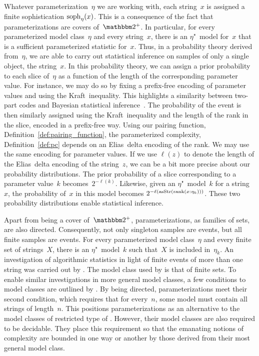 \label{p:inference}%
Whatever parameterization~$\eta$ we are working with, each string~$x$ is assigned a finite sophistication $\operatorname{soph}_\eta(x)$.
This is a consequence of the fact that parameterizations are covers of~$\binary^+$.
In particular, for every parameterized model class~$\eta$ and every string~$x$, there is an $\eta$"~model for~$x$ that is a sufficient parameterized statistic for~$x$.
Thus, in a probability theory derived from~$\eta$, we are able to carry out statistical inference on samples of only a single object, the string~$x$.
In this probability theory, we can assign a prior probability to each slice of~$\eta$ as a function of the length of the corresponding parameter value.
For instance, we may do so by fixing a prefix-free encoding of parameter values and using the Kraft~inequality.
This highlights a similarity between two-part codes and Bayesian statistical inference~\parencite{grunwald2007minimum}.
The probability of the event is then similarly assigned using the Kraft~inequality and the length of the rank in the slice, encoded in a prefix-free way.
Using our pairing function, Definition~\ref{def:pairing_function}, the parameterized complexity, Definition~\ref{def:pc} depends on an Elias~delta encoding of the rank.
We may use the same encoding for parameter values.
If we use $\ell(z)$ to denote the length of the Elias~delta encoding of the string~$z$, we can be a bit more precise about our probability distributions.
The prior probability of a slice corresponding to a parameter value~$k$ becomes~$2^{-\ell(k)}$.
Likewise, given an $\eta$"~model~$k$ for a string~$x$, the probability of~$x$ in this model becomes $2^{-\ell(\operatorname{asStr}(\operatorname{rank}(x : \eta_k)))}$.
These two probability distributions enable statistical inference.

Apart from being a cover of~$\binary^+$, parameterizations, as families of sets, are also directed.
Consequently, not only singleton samples are events, but all finite samples are events.
For every parameterized model class~$\eta$ and every finite set of strings~$X$, there is an $\eta$"~model~$k$ such that~$X$ is included in~$\eta_k$.
An investigation of algorithmic statistics in light of finite events of more than one string was carried out by \textcite{milovanov2016algorithmic}.
The model class used by \citeauthor{milovanov2016algorithmic} is that of finite sets.
To enable similar investigations in more general model classes, a few conditions to model classes are outlined by \textcite[Section~6.1]{vereshchagin2017algorithmic}.
By being directed, parameterizations meet their second condition, which requires that for every~$n$, some model must contain all strings of length~$n$.
This positions parameterizations as an alternative to the model classes of restricted type of \textcite{vereshchagin2017algorithmic}.
However, their model classes are also required to be decidable.
They place this requirement so that the emanating notions of complexity are bounded in one way or another by those derived from their most general model class.

